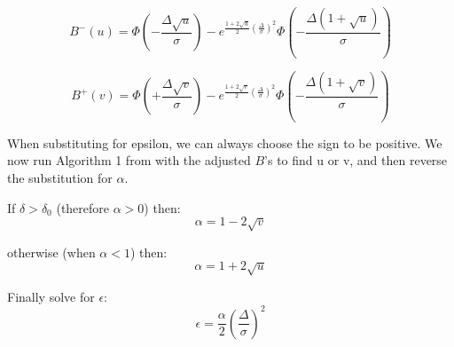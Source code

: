 \documentclass{article}
\theoremstyle{definition}
\begin{document}
\begin{equation}
    B^-(u) = \Phi\left(-\frac{\Delta\sqrt{u}}{\sigma}\right) - e^{\frac{1 + 2 \sqrt{u}}{2} (\frac{\Delta}{\sigma})^2} \Phi\left(-\frac{\Delta (1 + \sqrt{u})}{\sigma}\right)
\end{equation}

\begin{equation}
    B^+(v) = \Phi\left(+\frac{\Delta\sqrt{v}}{\sigma}\right) - e^{\frac{1 + 2 \sqrt{v}}{2} (\frac{\Delta}{\sigma})^2} \Phi\left(-\frac{\Delta (1 + \sqrt{v})}{\sigma}\right)
\end{equation}

When substituting for epsilon, we can always choose the sign to be positive. 
We now run Algorithm 1 from \cite{Balle2018ImprovingTG} with the adjusted $B$'s to find u or v, and then reverse the substitution for $\alpha$.

If $\delta > \delta_0$ (therefore $\alpha > 0$) then: 
\begin{equation}
    \alpha = 1 - 2 \sqrt{v}
\end{equation}

otherwise (when $\alpha < 1$) then: 
\begin{equation}
    \alpha = 1 + 2 \sqrt{u}
\end{equation}

Finally solve for $\epsilon$:
\begin{equation}
    \epsilon = \frac{\alpha}{2} \left(\frac{\Delta}{\sigma}\right)^2
\end{equation}




\end{document}

